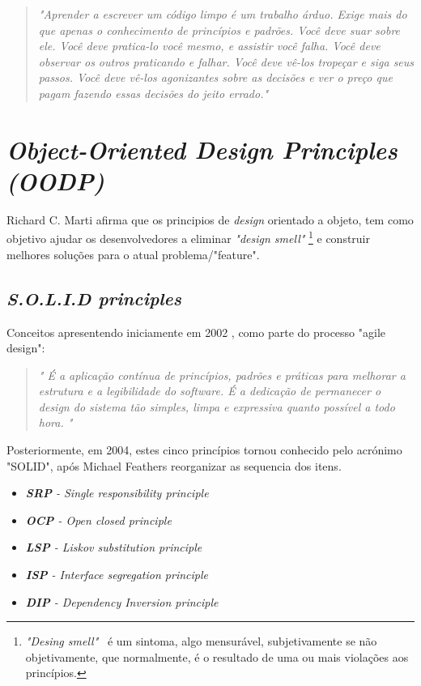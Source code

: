 \documentclass[12pt]{article}
\begin{document}
\begin{quotation}
\textit{"Aprender a escrever um código limpo é um trabalho árduo. Exige mais do que apenas o conhecimento de princípios e padrões. Você deve suar sobre ele. Você deve pratica-lo você mesmo, e assistir você falha. Você deve observar os outros praticando e falhar. Você deve vê-los tropeçar e siga seus passos. Você deve vê-los agonizantes sobre as decisões e ver o preço que pagam fazendo essas decisões do jeito errado." }
\end{quotation}

\section{\textit{Object-Oriented Design Principles (OODP)}} \label{sec:oopd}
 
 Richard C. Marti \cite{ROBERT_MARTIN_AGILE_SW_DEV_PPP} afirma que os principios de \textit{design} orientado a objeto, tem como objetivo ajudar os desenvolvedores a eliminar \textit{"design smell"} \footnote{\textit{"Desing smell"}\ \cite{ROBERT_MARTIN_AGILE_SW_DEV_PPP} é um sintoma, algo mensurável, subjetivamente se não objetivamente, que normalmente, é o resultado de uma ou mais violações aos princípios.} e construir melhores soluções para o atual problema/"feature".

\subsection{\textit{S.O.L.I.D principles}} \label{sec:solid}

 Conceitos apresentendo iniciamente em 2002 \cite{ROBERT_MARTIN_AGILE_SW_DEV_PPP}, como parte do processo "agile design":
 
 \begin{quote}
\textit{" É a aplicação contínua de princípios, padrões e práticas para melhorar a estrutura e a legibilidade do software. É a dedicação de permanecer o design do sistema tão simples, limpa e expressiva quanto possível a todo hora. "}
 \end{quote}

 Posteriormente, em 2004, estes cinco princípios tornou conhecido pelo acrónimo "SOLID", após Michael Feathers reorganizar as sequencia dos itens. 

\begin{itemize}
	\item \textit{\textbf{SRP} - Single responsibility principle}
	\item \textit{\textbf{OCP} - Open closed principle}
	\item \textit{\textbf{LSP} - Liskov substitution principle}
	\item \textit{\textbf{ISP} - Interface segregation principle}
	\item \textit{\textbf{DIP} - Dependency Inversion principle}
\end{itemize}
\end{document}
